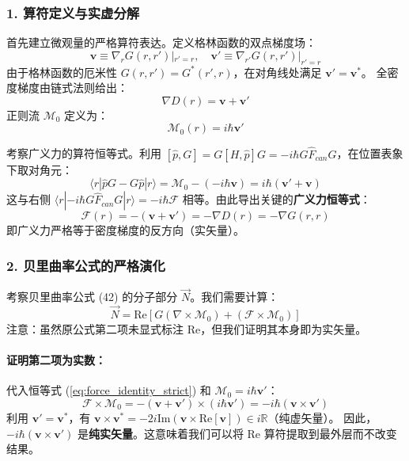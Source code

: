 \documentclass[a4paper,12pt]{article}
\begin{document}
\subsubsection{1. 算符定义与实虚分解}

首先建立微观量的严格算符表达。定义格林函数的双点梯度场：
\begin{equation}
    \mathbf{v} \equiv \nabla_r G(r,r')|_{r'=r}, \quad \mathbf{v}' \equiv \nabla_{r'} G(r,r')|_{r'=r}
\end{equation}
由于格林函数的厄米性 $G(r,r') = G^*(r',r)$，在对角线处满足 $\mathbf{v}' = \mathbf{v}^*$。
全密度梯度由链式法则给出：
\begin{equation}
    \nabla D(r) = \mathbf{v} + \mathbf{v}'
\end{equation}
正则流 $\mathcal{M}_0$ 定义为：
\begin{equation}
    \mathcal{M}_0(r) = i\hbar \mathbf{v}'
\end{equation}

考察广义力的算符恒等式。利用 $[\hat{p}, G] = G [H, \hat{p}] G = -i\hbar G \hat{F}_{can} G$，在位置表象下取对角元：
\begin{equation}
    \langle r | \hat{p} G - G \hat{p} | r \rangle = \mathcal{M}_0 - (-i\hbar \mathbf{v}) = i\hbar (\mathbf{v}' + \mathbf{v})
\end{equation}
这与右侧 $\langle r | -i\hbar G \hat{F}_{can} G | r \rangle = -i\hbar \mathcal{F}$ 相等。由此导出关键的\textbf{广义力恒等式}：
\begin{equation}
    \mathcal{F}(r) = -(\mathbf{v} + \mathbf{v}') = -\nabla D(r) = -\nabla G(r,r)
    \label{eq:force_identity_strict}
\end{equation}
即广义力严格等于密度梯度的反方向（实矢量）。

\subsubsection{2. 贝里曲率公式的严格演化}

考察贝里曲率公式 (42) 的分子部分 $\vec{N}$。我们需要计算：
\begin{equation}
    \vec{N} = \text{Re} \left[ G (\nabla \times \mathcal{M}_0) + (\mathcal{F} \times \mathcal{M}_0) \right]
\end{equation}
注意：虽然原公式第二项未显式标注 $\text{Re}$，但我们证明其本身即为实矢量。

\paragraph{证明第二项为实数：}
代入恒等式 (\ref{eq:force_identity_strict}) 和 $\mathcal{M}_0 = i\hbar \mathbf{v}'$：
\begin{equation}
    \mathcal{F} \times \mathcal{M}_0 = -(\mathbf{v} + \mathbf{v}') \times (i\hbar \mathbf{v}') = -i\hbar (\mathbf{v} \times \mathbf{v}')
\end{equation}
利用 $\mathbf{v}' = \mathbf{v}^*$，有 $\mathbf{v} \times \mathbf{v}^* = -2i \text{Im}(\mathbf{v} \times \text{Re}[\mathbf{v}]) \in i \mathbb{R}$（纯虚矢量）。
因此，$-i\hbar (\mathbf{v} \times \mathbf{v}')$ 是\textbf{纯实矢量}。这意味着我们可以将 $\text{Re}$ 算符提取到最外层而不改变结果。
\end{document}
